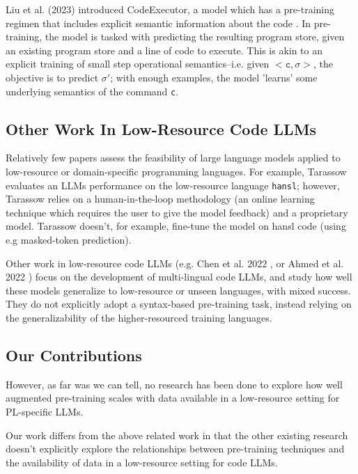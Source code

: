 \documentclass[acmlarge]{acmart}
\begin{document}
Liu et al. (2023) introduced CodeExecutor, a model which has a pre-training regimen that includes explicit semantic information about the code \cite{CodeExecutor}. In pre-training, the model is tasked with predicting the resulting program store, given an existing program store and a line of code to execute. This is akin to an explicit training of small step operational semantics--i.e. given $<\texttt{c}, \sigma>$, the objective is to predict $\sigma'$; with enough examples, the model 'learns' some underlying semantics of the command \texttt{c}.

\subsection{Other Work In Low-Resource Code LLMs}

Relatively few papers assess the feasibility of large language models applied to low-resource or domain-specific programming languages. For example, Tarassow \cite{tarassow2023-lr-code} evaluates an LLMs performance on the low-resource language \texttt{hansl}; however, Tarassow relies on a human-in-the-loop methodology (an online learning technique which requires the user to give the model feedback) and a proprietary model. Tarassow doesn't, for example, fine-tune the model on hansl code (using e.g masked-token prediction). 

Other work in low-resource code LLMs (e.g. Chen et al. 2022 \cite{chen2022transferability}, or Ahmed et al. 2022 \cite{ahmed-multilingual}) focus on the development of multi-lingual code LLMs, and study how well these models generalize to low-resource or unseen languages, with mixed success. They do not explicitly adopt a syntax-based pre-training task, instead relying on the generalizability of the higher-resourced training languages.

\subsection{Our Contributions}

However, as far was we can tell, no research has been done to explore how well augmented pre-training scales with data available in a low-resource setting for PL-specific LLMs.

Our work differs from the above related work in that the other existing research doesn't explicitly explore the relationships between pre-training techniques and the availability of data in a low-resource setting for code LLMs.
\end{document}

